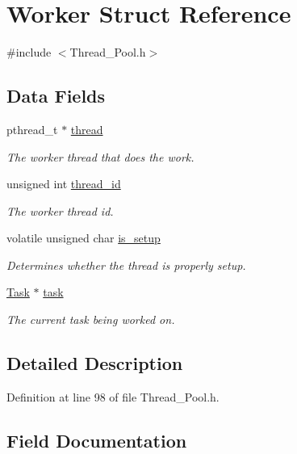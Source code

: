 \hypertarget{struct_worker}{}\section{Worker Struct Reference}
\label{struct_worker}


{\ttfamily \#include $<$Thread\+\_\+\+Pool.\+h$>$}

\subsection*{Data Fields}
\begin{DoxyCompactItemize}
\item 
pthread\+\_\+t $\ast$ \hyperlink{struct_worker_a6b67ec3785df1f36469a10e68b64ab6f}{thread}
\begin{DoxyCompactList}\small\item\em The worker thread that does the work. \end{DoxyCompactList}\item 
unsigned int \hyperlink{struct_worker_a720bccae6839fa7ee8161f77f337fc15}{thread\+\_\+id}
\begin{DoxyCompactList}\small\item\em The worker thread id. \end{DoxyCompactList}\item 
volatile unsigned char \hyperlink{struct_worker_ae294086f45f8af167507131a38e07873}{is\+\_\+setup}
\begin{DoxyCompactList}\small\item\em Determines whether the thread is properly setup. \end{DoxyCompactList}\item 
\hyperlink{struct_task}{Task} $\ast$ \hyperlink{struct_worker_adac025b94121ea5ab5dd2a3a715ca778}{task}
\begin{DoxyCompactList}\small\item\em The current task being worked on. \end{DoxyCompactList}\end{DoxyCompactItemize}


\subsection{Detailed Description}


Definition at line 98 of file Thread\+\_\+\+Pool.\+h.



\subsection{Field Documentation}
\hypertarget{struct_worker_ae294086f45f8af167507131a38e07873}{}
